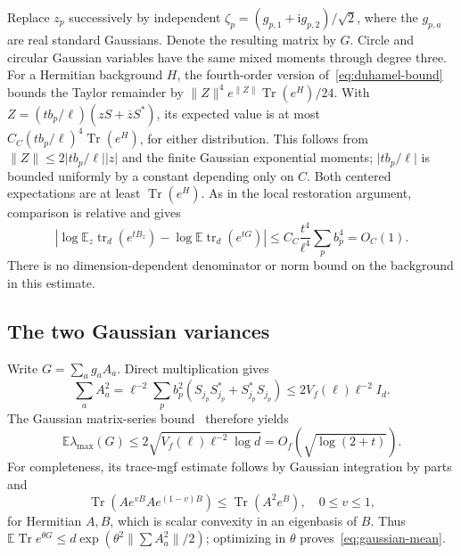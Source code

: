 \documentclass[11pt,reqno]{amsart}
\numberwithin{equation}{section}
\newcommand{\E}{\mathbb E}
\newcommand{\Tr}{\operatorname{Tr}}
\newcommand{\tr}{\operatorname{tr}}
\newcommand{\ii}{\mathrm i}
\newcommand{\norm}[1]{\lVert#1\rVert}
\newcommand{\abs}[1]{\lvert#1\rvert}
\begin{document}
Replace $z_p$ successively by independent
$\zeta_p=(g_{p,1}+\ii g_{p,2})/\sqrt2$, where the $g_{p,a}$ are
real standard Gaussians. Denote the resulting matrix by $G$.
Circle and circular Gaussian variables have the same mixed
moments through degree three. For a Hermitian background $H$,
the fourth-order version of~\eqref{eq:duhamel-bound} bounds the
Taylor remainder by
$\norm Z^4e^{\norm Z}\Tr(e^H)/24$.
With $Z=(tb_p/\ell)(zS+\overline zS^*)$, its expected value is
at most $C_C(t b_p/\ell)^4\Tr(e^H)$, for either distribution.
This follows from $\norm Z\le2\abs{tb_p/\ell}\abs z$ and
the finite Gaussian exponential moments; $\abs{tb_p/\ell}$
is bounded uniformly by a constant depending only on $C$.
Both centered expectations are at least $\Tr(e^H)$. As in the
local restoration argument, comparison is relative and gives
\begin{equation}\label{eq:gauss-replacement}
 \left|\log\E_z\tr_d(e^{tB_z})-
             \log\E\tr_d(e^{tG})\right|
 \le C_C\frac{t^4}{\ell^4}\sum_pb_p^4=O_C(1).
\end{equation}
There is no dimension-dependent denominator or norm bound on the
background in this estimate.

\subsection*{The two Gaussian variances}

Write $G=\sum_a g_aA_a$. Direct multiplication gives
\[
 \sum_aA_a^2
  =\ell^{-2}\sum_pb_p^2(S_{j_p}S_{j_p}^*+S_{j_p}^*S_{j_p})
  \le2V_f(\ell)\ell^{-2}I_d.
\]
The Gaussian matrix-series bound~\cite{Tropp} therefore yields
\begin{equation}\label{eq:gaussian-mean}
 \E\lambda_{\max}(G)
       \le2\sqrt{V_f(\ell)\ell^{-2}\log d}
       =O_f(\sqrt{\log(2+t)}).
\end{equation}
For completeness, its trace-mgf estimate follows by Gaussian
integration by parts and
\[
 \Tr(Ae^{vB}Ae^{(1-v)B})\le\Tr(A^2e^B),\quad0\le v\le1,
\]
for Hermitian $A,B$, which is scalar convexity in an eigenbasis
of $B$. Thus $\E\Tr e^{\theta G}\le
d\exp(\theta^2\norm{\sum A_a^2}/2)$; optimizing in $\theta$
proves~\eqref{eq:gaussian-mean}.
\end{document}
